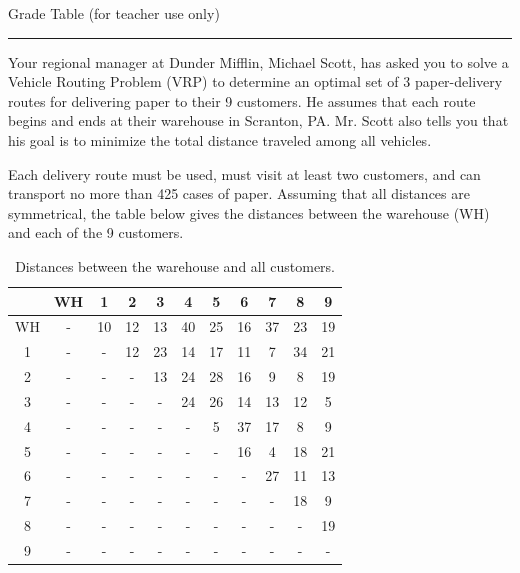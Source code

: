 \documentclass[12pt]{exam}
\begin{document}
\begin{center}
Grade Table (for teacher use only)\\
\addpoints
\gradetable[v][questions]
\end{center}

\noindent
\rule[2ex]{\textwidth}{2pt}

\newpage %




\begin{questions}
\question Your regional manager at Dunder Mifflin, Michael Scott, has asked you to solve a Vehicle Routing Problem (VRP) to determine an optimal set of 3 paper-delivery routes for delivering paper to their 9 customers. He assumes that each route begins and ends at their warehouse in Scranton, PA. Mr. Scott also tells you that his goal is to minimize the total distance traveled among all vehicles. 

Each delivery route must be used, must visit at least two customers, and can transport no more than 425 cases of paper. Assuming that all distances are symmetrical, the table below gives the distances between the warehouse (WH) and each of the 9 customers.

\begin{table}[h]
\caption{Distances between the warehouse and all customers.}
\begin{center}
\begin{tabular}{|c|c|c|c|c|c|c|c|c|c|c|}
\hline
& WH &1&2&3&4&5&6&7&8&9\\ \hline
WH & - &10&12&13&40&25&16&37&23&19 \\ \hline
1& -  & - & 12 & 23 & 14 & 17 & 11 & 7 & 34 & 21 \\ \hline
2& -  & -  & - & 13 & 24 & 28 & 16 & 9 & 8 & 19 \\ \hline
3& -  & -  & -  & - & 24 & 26 & 14 & 13 & 12  & 5 \\ \hline
4& -  & -  & -  & -  & - & 5 & 37 & 17 & 8 & 9 \\ \hline
5&-  & -  & -  & -  & -  & - & 16 & 4 & 18 &  21 \\ \hline
6& -  & -  & -  &-  & -  & -  & - & 27 & 11 &  13 \\ \hline
7& -  & -  & -  & -  & -  & -  & -  & - & 18 & 9 \\ \hline
8& -  & -  & -  & -  &-  & -  &-  & -  & - & 19 \\ \hline
9& -  & -  & -  &-  & -  & -  & -  & -  & -   &- \\ \hline
\end{tabular}


\end{center}
\end{table}
\end{questions}
\end{document}
